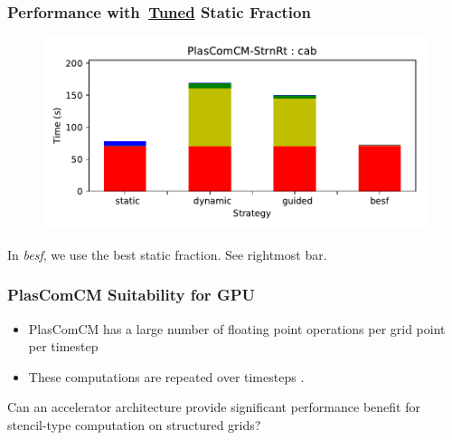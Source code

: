 \begin{frame}[label=halftimings]
\frametitle{Performance with~\hyperlink{expTunedSF}{Tuned} Static Fraction}
\begin{figure}[ht!]
\begin{center}
\includegraphics[scale=0.34]{./plots/dmTime-PlasComCM-StrnRt-cab-withbesf}
\end{center}
\label{fig:dmTimes-NASLU-cab}
\end{figure}
\begin{center}
{\small In \textit{besf}, we use the best static fraction. See rightmost bar.}
\end{center}
\end{frame}

\begin{frame}
\frametitle{PlasComCM Suitability for GPU} 
\begin{itemize} 
\small \item \small PlasComCM has a large number of floating point
operations per grid point per timestep 
\item \small These computations are repeated over
  timesteps . 
\end{itemize} 
{\small Can an accelerator architecture provide significant performance
benefit for stencil-type computation on structured grids?} 
\end{frame} 

